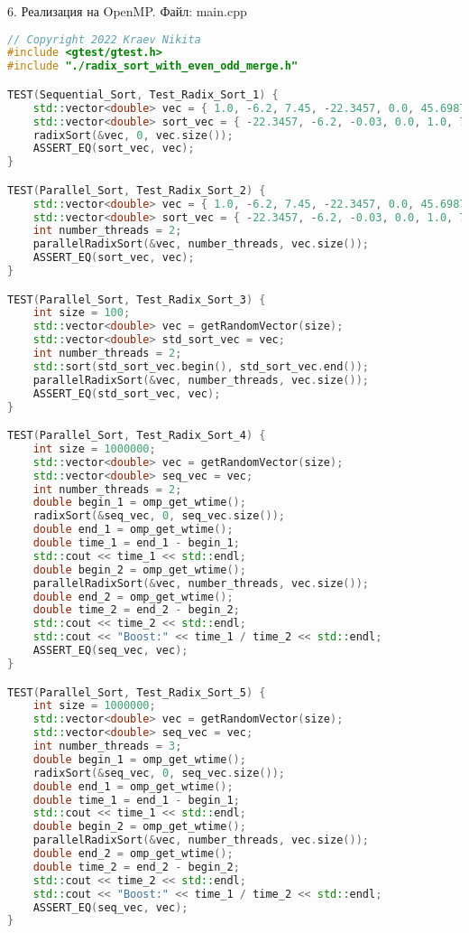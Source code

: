 \documentclass{report}
\begin{document}
\par 6. Реализация на OpenMP. Файл: main.cpp

\begin{lstlisting}[language=C++]
// Copyright 2022 Kraev Nikita
#include <gtest/gtest.h>
#include "./radix_sort_with_even_odd_merge.h"

TEST(Sequential_Sort, Test_Radix_Sort_1) {
    std::vector<double> vec = { 1.0, -6.2, 7.45, -22.3457, 0.0, 45.69876, -0.03 };
    std::vector<double> sort_vec = { -22.3457, -6.2, -0.03, 0.0, 1.0, 7.45, 45.69876 };
    radixSort(&vec, 0, vec.size());
    ASSERT_EQ(sort_vec, vec);
}

TEST(Parallel_Sort, Test_Radix_Sort_2) {
    std::vector<double> vec = { 1.0, -6.2, 7.45, -22.3457, 0.0, 45.69876, -0.03 };
    std::vector<double> sort_vec = { -22.3457, -6.2, -0.03, 0.0, 1.0, 7.45, 45.69876 };
    int number_threads = 2;
    parallelRadixSort(&vec, number_threads, vec.size());
    ASSERT_EQ(sort_vec, vec);
}

TEST(Parallel_Sort, Test_Radix_Sort_3) {
    int size = 100;
    std::vector<double> vec = getRandomVector(size);
    std::vector<double> std_sort_vec = vec;
    int number_threads = 2;
    std::sort(std_sort_vec.begin(), std_sort_vec.end());
    parallelRadixSort(&vec, number_threads, vec.size());
    ASSERT_EQ(std_sort_vec, vec);
}

TEST(Parallel_Sort, Test_Radix_Sort_4) {
    int size = 1000000;
    std::vector<double> vec = getRandomVector(size);
    std::vector<double> seq_vec = vec;
    int number_threads = 2;
    double begin_1 = omp_get_wtime();
    radixSort(&seq_vec, 0, seq_vec.size());
    double end_1 = omp_get_wtime();
    double time_1 = end_1 - begin_1;
    std::cout << time_1 << std::endl;
    double begin_2 = omp_get_wtime();
    parallelRadixSort(&vec, number_threads, vec.size());
    double end_2 = omp_get_wtime();
    double time_2 = end_2 - begin_2;
    std::cout << time_2 << std::endl;
    std::cout << "Boost:" << time_1 / time_2 << std::endl;
    ASSERT_EQ(seq_vec, vec);
}

TEST(Parallel_Sort, Test_Radix_Sort_5) {
    int size = 1000000;
    std::vector<double> vec = getRandomVector(size);
    std::vector<double> seq_vec = vec;
    int number_threads = 3;
    double begin_1 = omp_get_wtime();
    radixSort(&seq_vec, 0, seq_vec.size());
    double end_1 = omp_get_wtime();
    double time_1 = end_1 - begin_1;
    std::cout << time_1 << std::endl;
    double begin_2 = omp_get_wtime();
    parallelRadixSort(&vec, number_threads, vec.size());
    double end_2 = omp_get_wtime();
    double time_2 = end_2 - begin_2;
    std::cout << time_2 << std::endl;
    std::cout << "Boost:" << time_1 / time_2 << std::endl;
    ASSERT_EQ(seq_vec, vec);
}


\end{lstlisting}
\end{document}
